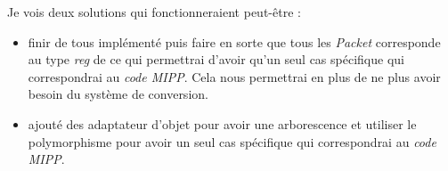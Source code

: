 Je vois deux solutions qui fonctionneraient peut-être :

\begin{itemize}
  \item finir de tous implémenté puis faire en sorte que tous les \emph{Packet}
  corresponde au type \emph{reg} de \MIPP ce qui permettrai d'avoir qu'un seul cas
  spécifique qui correspondrai au \emph{code MIPP}. Cela nous permettrai en plus de ne
  plus avoir besoin du système de conversion.
  \item ajouté des adaptateur d'objet pour avoir une arborescence et utiliser le
  polymorphisme pour avoir un seul cas spécifique qui correspondrai au \emph{code MIPP}.
\end{itemize}
